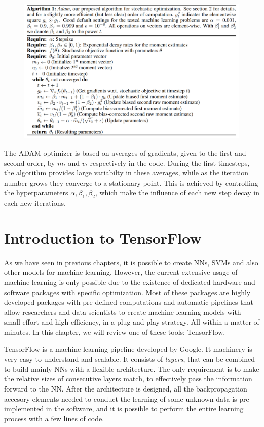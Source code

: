 \documentclass[]{report}
\begin{document}
\begin{figure}
\centering
\includegraphics[width = \linewidth]{images/adam}
\end{figure}

The ADAM optimizer is based on averages of gradients, given to the first and second order, by $m_t$ and $v_t$ respectively in the code. During the first timesteps, the algorithm provides large variabilty in these averages, while as the iteration number grows they converge to a stationary point. This is achieved by controlling the hyperparameters $\alpha, \beta_1, \beta_2$, which make the influence of each new step decay in each new iterations. 

\chapter{Introduction to TensorFlow}\label{sec.tensorflow}

As we have seen in previous chapters, it is possible to create NNs, SVMs and also other models for machine learning. However, the current extensive usage of machine learning is only possible due to the existence of dedicated hardware and software packages with specific optimization. Most of these packages are highly developed packages with pre-defined computations and automatic pipelines that allow researchers and data scientists to create machine learning models with small effort and high efficiency, in a plug-and-play strategy. All within a matter of minutes. In this chapter, we will review one of these tools: TensorFlow. 

TensorFlow is a machine learning pipeline developed by Google. It machinery is very easy to understand and scalable. It consists of \textit{layers}, that can be combined to build mainly NNs with a flexible architecture. The only requirement is to make the relative sizes of consecutive layers match, to effectively pass the information forward to the NN. After the architecture is designed, all the backpropagation accesory elements needed to conduct the learning of some unknown data is pre-implemented in the software, and it is possible to perform the entire learning process with a few lines of code. 
\end{document}
